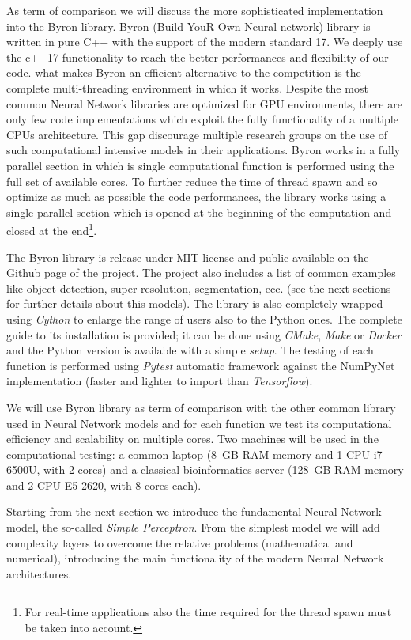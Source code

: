 \documentclass{standalone}
\begin{document}
As term of comparison we will discuss the more sophisticated implementation into the Byron library.
Byron (Build YouR Own Neural network) library is written in pure C++ with the support of the modern standard 17.
We deeply use the c++17 functionality to reach the better performances and flexibility of our code.
what makes Byron an efficient alternative to the competition is the complete multi-threading environment in which it works.
Despite the most common Neural Network libraries are optimized for GPU environments, there are only few code implementations which exploit the fully functionality of a multiple CPUs architecture.
This gap discourage multiple research groups on the use of such computational intensive models in their applications.
Byron works in a fully parallel section in which is single computational function is performed using the full set of available cores.
To further reduce the time of thread spawn and so optimize as much as possible the code performances, the library works using a single parallel section which is opened at the beginning of the computation and closed at the end\footnote{
  For real-time applications also the time required for the thread spawn must be taken into account.
}.

The Byron library is release under MIT license and public available on the Github page of the project.
The project also includes a list of common examples like object detection, super resolution, segmentation, ecc. (see the next sections for further details about this models).
The library is also completely wrapped using \emph{Cython} to enlarge the range of users also to the Python ones.
The complete guide to its installation is provided; it can be done using \emph{CMake}, \emph{Make} or \emph{Docker} and the Python version is available with a simple \emph{setup}.
The testing of each function is performed using \emph{Pytest} automatic framework against the NumPyNet implementation (faster and lighter to import than \emph{Tensorflow}).

We will use Byron library as term of comparison with the other common library used in Neural Network models and for each function we test its computational efficiency and scalability on multiple cores.
Two machines will be used in the computational testing: a common laptop (8~GB RAM memory and 1 CPU i7-6500U, with 2 cores) and a classical bioinformatics server (128~GB RAM memory and 2 CPU E5-2620, with 8 cores each).

Starting from the next section we introduce the fundamental Neural Network model, the so-called \emph{Simple Perceptron}.
From the simplest model we will add complexity layers to overcome the relative problems (mathematical and numerical), introducing the main functionality of the modern Neural Network architectures.
\end{document}
